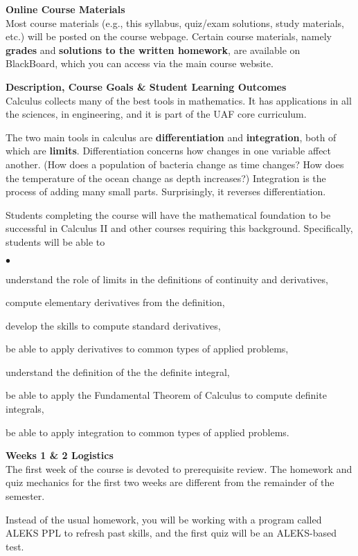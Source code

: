 \documentclass[12pt]{article}
\renewcommand{\emph}[1]{\textsf{\textbf{#1}}}
\newcommand{\localhead}[1]{\par\smallskip\textbf{#1}\nobreak\\}%
\def\heading#1{\localhead{\large\emph{#1}}}
\newenvironment{clist}%
{\bgroup\parskip 0pt\begin{list}{$\bullet$}{\partopsep 4pt\topsep 0pt\itemsep -2pt}}%
{\end{list}\egroup}%
\begin{document}
\heading{Online Course Materials}
Most course materials (e.g., this syllabus, quiz/exam solutions, study materials, etc.) will be posted on the course webpage.  Certain course materials, namely \emph{grades} and \emph{solutions to the written homework}, are available on BlackBoard, which you can access via the main course website.

\heading{Description, Course Goals \& Student Learning Outcomes}
Calculus collects many of the best tools in mathematics.  It has applications in all the sciences, in engineering, and it is part of the UAF core curriculum.

The two main tools in calculus are \emph{differentiation} and \emph{integration}, both of which are \emph{limits}.  Differentiation concerns how changes in one variable affect another.  (How does a population of bacteria change as time changes?  How does the temperature of the ocean change as depth increases?)  Integration is the process of adding many small parts.  Surprisingly, it reverses differentiation.

Students completing the course will have the mathematical foundation to be successful in Calculus II and other courses
requiring this background.  Specifically, students will be able to

\begin{clist}
\item understand the role of limits in the definitions of continuity and derivatives,
\item compute elementary derivatives from the definition,
\item develop the skills to compute standard derivatives,
\item be able to apply derivatives to common types of applied problems,
\item understand the definition of the the definite integral,
\item be able to apply the Fundamental Theorem of Calculus to
compute definite integrals,
\item be able to apply integration to common types of applied problems.
\end{clist}

\heading{Weeks 1 \& 2 Logistics}
The first week of the course is devoted to prerequisite review.  The homework and quiz mechanics for the first two weeks are different from the remainder of the semester.

Instead of the usual homework, you will be working with a program called ALEKS PPL to refresh past skills, and the first quiz will be an ALEKS-based test.  
\end{document}
